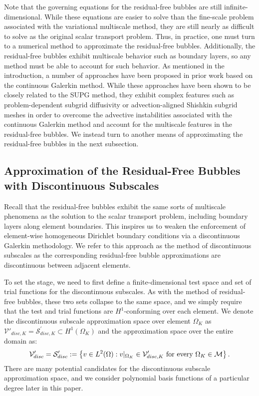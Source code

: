 \documentclass[11pt]{article}
\begin{document}
Note that the governing equations for the residual-free bubbles are still infinite-dimensional.  While these equations are easier to solve than the fine-scale problem associated with the variational multiscale method, they are still nearly as difficult to solve as the original scalar transport problem.  Thus, in practice, one must turn to a numerical method to approximate the residual-free bubbles.  Additionally, the residual-free bubbles exhibit multiscale behavior such as boundary layers, so any method must be able to account for such behavior.  As mentioned in the introduction, a number of approaches have been proposed in prior work based on the continuous Galerkin method.  While these approaches have been shown to be closely related to the SUPG method, they exhibit complex features such as problem-dependent subgrid diffusivity \cite{Brezzi00} or advection-aligned Shishkin subgrid meshes \cite{Brezzi03} in order to overcome the advective instabilities associated with the continuous Galerkin method and account for the multiscale features in the residual-free bubbles.  We instead turn to another means of approximating the residual-free bubbles in the next subsection.

\subsection{Approximation of the Residual-Free Bubbles with Discontinuous Subscales}

Recall that the residual-free bubbles exhibit the same sorts of multiscale phenomena as the solution to the scalar transport problem,  including boundary layers along element boundaries.  This inspires us to weaken the enforcement of element-wise homogeneous Dirichlet boundary conditions via a discontinuous Galerkin methodology.  We refer to this approach as the method of discontinuous subscales as the corresponding residual-free bubble approximations are discontinuous between adjacent elements.

To set the stage, we need to first define a finite-dimensional test space and set of trial functions for the discontinuous subscales.  As with the method of residual-free bubbles, these two sets collapse to the same space, and we simply require that the test and trial functions are $H^1$-conforming over each element.  We denote the discontinuous subscale approximation space over element $\Omega_K$ as $\mathcal{V}'_{disc,K} = \mathcal{S}^'_{disc,K} \subset H^1\left(\Omega_K\right)$ and the approximation space over the entire domain as:
\begin{equation}
\mathcal{V}'_{disc} = \mathcal{S}'_{disc} := \left\{ v \in L^2(\Omega): v|_{\Omega_K} \in \mathcal{V}'_{disc,K} \textup{ for every } \Omega_K \in \mathcal{M} \right\}.
\end{equation}
There are many potential candidates for the discontinuous subscale approximation space, and we consider polynomial basis functions of a particular degree later in this paper.
\end{document}
